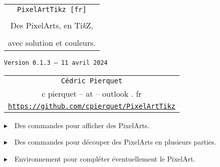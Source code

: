 \documentclass{article}
\def\TPversion{0.1.3}
\def\TPdate{11 avril 2024}
\begin{document}
\pagestyle{fancy}

\thispagestyle{empty}

\vspace{2cm}

\begin{center}
	\begin{minipage}{0.75\linewidth}
	\begin{tcolorbox}[colframe=yellow,colback=yellow!15]
		\begin{center}
			\begin{tabular}{c}
				{\Huge \texttt{PixelArtTikz [fr]}}\\
				\\
				{\LARGE Des PixelArts, en Ti\textit{k}Z}, \\
				\\
				{\LARGE avec solution et couleurs.} \\
			\end{tabular}
			
			\medskip
			
			{\small \texttt{Version \TPversion{} -- \TPdate}}
		\end{center}
	\end{tcolorbox}
\end{minipage}
\end{center}

\vspace{0.5cm}

\begin{center}
	\begin{tabular}{c}
	\texttt{Cédric Pierquet}\\
	{\ttfamily c pierquet -- at -- outlook . fr}\\
	\texttt{\url{https://github.com/cpierquet/PixelArtTikz}}
\end{tabular}
\end{center}

\vspace{0.25cm}

{$\blacktriangleright$~~Des commandes pour afficher des PixelArts.}

\smallskip

{$\blacktriangleright$~~Des commandes pour découper des PixelArts en plusieurs parties.}

\smallskip

{$\blacktriangleright$~~Environnement pour compléter éventuellement le PixelArt.}

\smallskip

\vspace{1cm}
\end{document}
